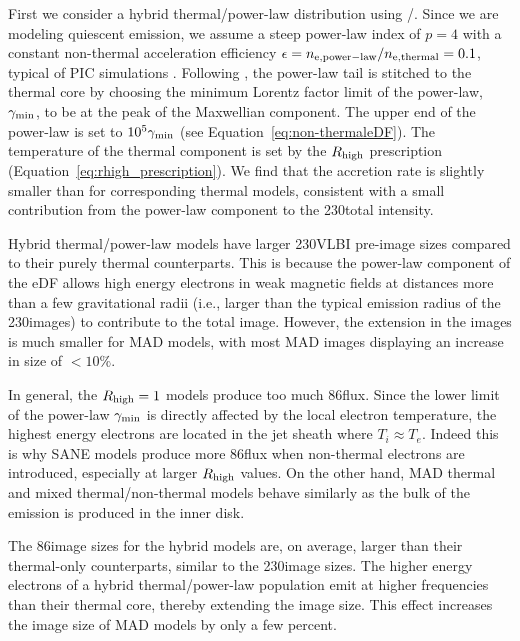 First we consider a hybrid thermal/power-law distribution using \hamr/\bhoss.
Since we are modeling quiescent emission, we assume a steep power-law index of $p=4$ with a constant non-thermal acceleration efficiency $\epsilon=n_{\rm e, power-law}/n_{\rm e, thermal}=0.1$, typical of PIC simulations \citep[e.g.,][]{Sironi2015,Crumley2019}.
Following \citet{Chatterjee2021}, the power-law tail is stitched to the thermal core by choosing the minimum Lorentz factor limit of the power-law, $\gamma_{\rm min}$, to be at the peak of the Maxwellian component.
The upper end of the power-law is set to $10^5 \gamma_{\rm min}$ (see Equation~\ref{eq:non-thermaleDF}).
The temperature of the thermal component is set by the $R_\mathrm{high}$ prescription (Equation~\ref{eq:rhigh_prescription}).
We find that the accretion rate is slightly smaller than for corresponding thermal models, consistent with a small contribution from the power-law component to the 230\GHz total intensity.


Hybrid thermal/power-law models have larger 230\GHz VLBI pre-image sizes compared to their purely thermal counterparts.
This is because the power-law component of the eDF allows high energy electrons in weak magnetic fields at distances more than a few gravitational radii (i.e., larger than the typical emission radius of the 230\GHz images) to contribute to the total image.
However, the extension in the images is much smaller for MAD models, with most MAD images displaying an increase in size of $<10\%$.


In general, the $R_{\rm high}=1$ models produce too much 86\GHz flux.
Since the lower limit of the power-law $\gamma_{\rm min}$ is directly affected by the local electron temperature, the highest energy electrons are located in the jet sheath where $T_i \approx T_e$.
Indeed this is why SANE models produce more 86\GHz flux when non-thermal electrons are introduced, especially at larger $R_\mathrm{high}$ values.
On the other hand, MAD thermal and mixed thermal/non-thermal models behave similarly as the bulk of the emission is produced in the inner disk.

The 86\GHz image sizes for the hybrid \hamr models are, on average, larger than their thermal-only counterparts, similar to the 230\GHz image sizes.
The higher energy electrons of a hybrid thermal/power-law population emit at higher frequencies than their thermal core, thereby extending the image size.
This effect increases the image size of MAD models by only a few percent.

